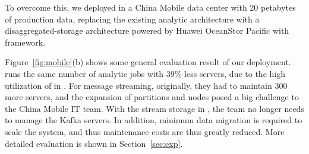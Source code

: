 To overcome this, we deployed \sys in a China Mobile data center with 20 petabytes of production data, replacing the existing analytic architecture with a disaggregated-storage architecture powered by Huawei OceanStor Pacific with  \sys framework.


 Figure~\ref{fig:mobile}(b) shows some general evaluation result of our deployment. \sys runs the same number of analytic jobs with 39\% less servers, due to the high utilization of  in \sys. 
For message streaming, originally, they had to maintain 300 more \kafka servers, and the expansion of partitions and nodes posed a big challenge to the China Mobile IT team. With the stream storage in \sys, the team no longer needs to  manage the Kafka servers. In addition, minimum data migration is required to scale the system, and thus maintenance costs are thus greatly reduced. More detailed evaluation is shown in Section~\ref{sec:exp}.

 
 
 
 
 
 \iffalse

